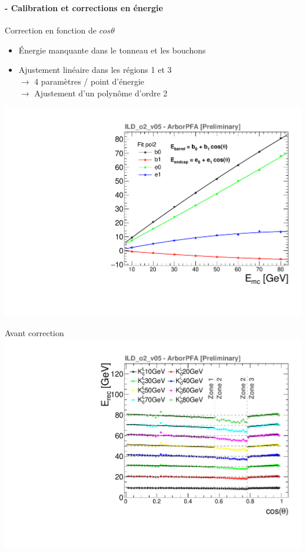 \documentclass[8pt]{beamer}
\begin{document}
  \begin{frame}
  \frametitle{\secname}
  \framesubtitle{\subsecname - Calibration et corrections en énergie}
    \begin{minipage}{0.53\linewidth}
      \begin{block}{Correction en fonction de $cos\theta$}
        \begin{itemize}
          \item Énergie manquante dans le tonneau et les bouchons
          \item Ajustement linéaire dans les régions 1 et 3 \\
          $\rightarrow$ 4 paramètres / point d'énergie \\
          $\rightarrow$ Ajustement d'un polynôme d'ordre 2
        \end{itemize}
      \end{block}
      \begin{center}
          \includegraphics[width=0.8\linewidth]{ThetaCalibFit_pol2_thesis.pdf}
      \end{center}
    \end{minipage} \hfill
    \begin{minipage}{0.46\linewidth}
      \begin{center}
        Avant correction \\ \includegraphics[width=0.75\linewidth]{ERecLinGap_fits_thesis.pdf} \\

\end{center}
\end{minipage}
\end{frame}
\end{document}
